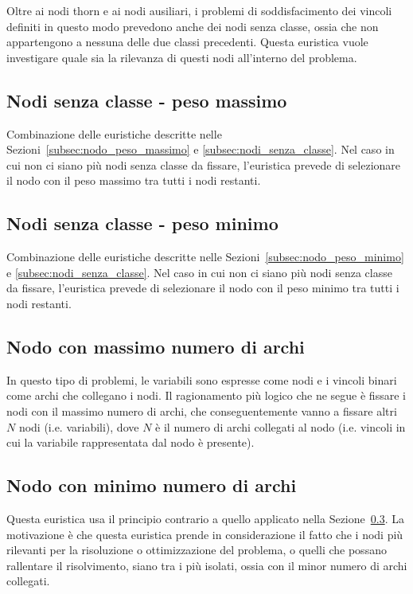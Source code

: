 Oltre ai nodi thorn e ai nodi ausiliari, i problemi di soddisfacimento dei vincoli definiti in questo modo prevedono anche dei nodi senza classe, ossia che non appartengono a nessuna delle due classi precedenti. Questa euristica vuole investigare quale sia la rilevanza di questi nodi all'interno del problema.

\subsection{Nodi senza classe - peso massimo}

Combinazione delle euristiche descritte nelle Sezioni~\ref{subsec:nodo_peso_massimo} e \ref{subsec:nodi_senza_classe}. Nel caso in cui non ci siano più nodi senza classe da fissare, l'euristica prevede di selezionare il nodo con il peso massimo tra tutti i nodi restanti.

\subsection{Nodi senza classe - peso minimo}

Combinazione delle euristiche descritte nelle Sezioni~\ref{subsec:nodo_peso_minimo} e \ref{subsec:nodi_senza_classe}. Nel caso in cui non ci siano più nodi senza classe da fissare, l'euristica prevede di selezionare il nodo con il peso minimo tra tutti i nodi restanti.

\subsection{Nodo con massimo numero di archi}\label{subsec:nodo_massimo_numero_archi}

In questo tipo di problemi, le variabili sono espresse come nodi e i vincoli binari come archi che collegano i nodi. Il ragionamento più logico che ne segue è fissare i nodi con il massimo numero di archi, che conseguentemente vanno a fissare altri $N$ nodi (i.e. variabili), dove $N$ è il numero di archi collegati al nodo (i.e. vincoli in cui la variabile rappresentata dal nodo è presente).

\subsection{Nodo con minimo numero di archi}

Questa euristica usa il principio contrario a quello applicato nella Sezione~\ref{subsec:nodo_massimo_numero_archi}. La motivazione è che questa euristica prende in considerazione il fatto che i nodi più rilevanti per la risoluzione o ottimizzazione del problema, o quelli che possano rallentare il risolvimento, siano tra i più isolati, ossia con il minor numero di archi collegati.